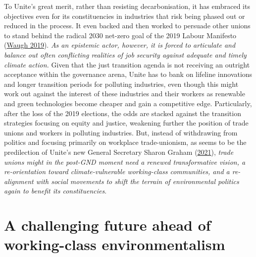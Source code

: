 \documentclass[a4paper, nobind]{templates/ociamthesis}
\begin{document}
To Unite's great merit, rather than resisting decarbonisation, it has embraced its objectives even for its constituencies in industries that risk being phased out or reduced in the process. It even backed and then worked to persuade other unions to stand behind the radical 2030 net-zero goal of the 2019 Labour Manifesto (\protect\hyperlink{ref-waugh_labour_2019}{Waugh 2019}). \emph{As an epistemic actor, however, it is forced to articulate and balance out often conflicting realities of job security against adequate and timely climate action.} Given that the just transition agenda is not receiving an outright acceptance within the governance arena, Unite has to bank on lifeline innovations and longer transition periods for polluting industries, even though this might work out against the interest of these industries and their workers as renewable and green technologies become cheaper and gain a competitive edge. Particularly, after the loss of the 2019 elections, the odds are stacked against the transition strategies focusing on equity and justice, weakening further the position of trade unions and workers in polluting industries. But, instead of withdrawing from politics and focusing primarily on workplace trade-unionism, as seems to be the predilection of Unite's new General Secretary Sharon Graham (\protect\hyperlink{ref-graham_sharons_2021}{2021}), \emph{trade unions might in the post-GND moment need a renewed transformative vision, a re-orientation toward climate-vulnerable working-class communities, and a re-alignment with social movements to shift the terrain of environmental politics again to benefit its constituencies}.

\hypertarget{a-challenging-future-ahead-of-working-class-environmentalism}{%
\section{A challenging future ahead of working-class environmentalism}\label{a-challenging-future-ahead-of-working-class-environmentalism}}
\end{document}
